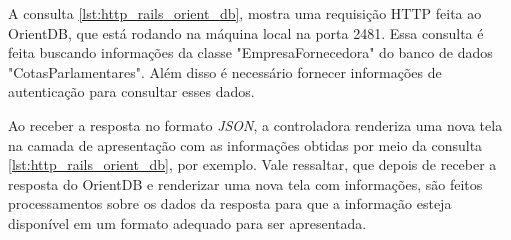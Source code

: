 A consulta \ref{lst:http_rails_orient_db}, mostra uma requisição HTTP feita ao OrientDB, que está rodando na máquina local na porta 2481. Essa consulta é feita buscando informações da classe "EmpresaFornecedora" do banco de dados "CotasParlamentares". Além disso é necessário fornecer informações de autenticação para consultar esses dados.

Ao receber a resposta no formato \textit{JSON}, a controladora renderiza uma nova tela na camada de apresentação com as informações obtidas por meio da consulta \ref{lst:http_rails_orient_db}, por exemplo. Vale ressaltar, que depois de receber a resposta do OrientDB e renderizar uma nova tela com informações, são feitos processamentos sobre os dados da resposta para que a informação esteja disponível em um formato adequado para ser apresentada.

